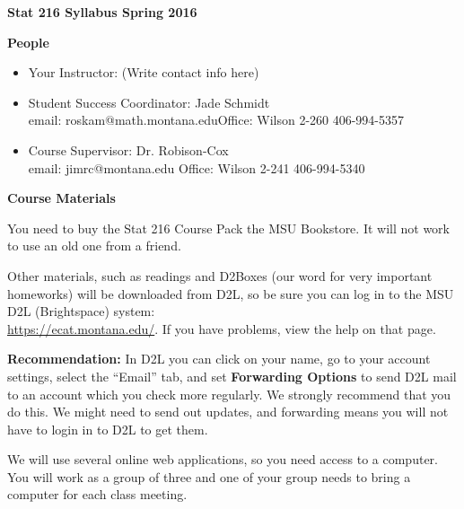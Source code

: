 \setcounter{page}{1}

\def\theTopic{Intro \& Syllabus }
\def\dayNum{1}


\begin{center}
\vspace*{.1in}
{\bf {\large Stat 216 Syllabus Spring 2016}}\\
\end{center}
\vspace{-.1in}

\begin{center}
  {\bf People}
\end{center}
\begin{itemize}
\item Your Instructor: (Write contact info here) \vspace{5.5cm}
\item Student Success Coordinator:  Jade Schmidt\\
     email: roskam@math.montana.edu\hfill Office: Wilson 2-260 \hfill
     406-994-5357
   \item Course Supervisor: Dr. Robison-Cox\\
     email: jimrc@montana.edu \hfill  Office: Wilson 2-241 \hfill
     406-994-5340
\end{itemize}


\begin{center}
  {\bf Course Materials}
\end{center}
  You need to buy the Stat 216  Course Pack  the MSU
  Bookstore.  It will not work to use an old one from a friend.

  Other materials, such as readings and D2Boxes (our word for
  very important homeworks) will be downloaded from D2L, so be
  sure you can log in to the MSU D2L (Brightspace) system:\\
   \url{https://ecat.montana.edu/}.  If you have problems, view the
   help on that page.

  {\bf Recommendation:}  In D2L you can click on your name, go to your
    account settings,  select  the ``Email'' tab, and set {\bf
      Forwarding Options} to send D2L mail to an account which you
    check more regularly.  We strongly recommend that you do this.  We
    might need to send out updates, and forwarding means you will not
    have to login in to D2L to get them.

  We will  use several online web applications,  so you need
  access to a computer.  You will work as a group of three and one of
  your group needs to bring a computer for each class meeting.\\
 
